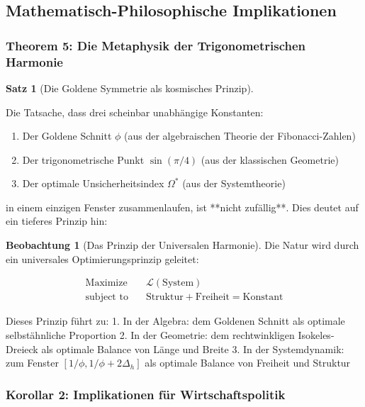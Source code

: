 \documentclass[a4paper,12pt,twoside]{report}
\theoremstyle{definition}
\newtheorem{satz}{Satz}
\newtheorem{beobachtung}{Beobachtung}
\begin{document}
\subsection{Mathematisch-Philosophische Implikationen}

\subsubsection*{Theorem 5: Die Metaphysik der Trigonometrischen Harmonie}

\begin{satz}[Die Goldene Symmetrie als kosmisches Prinzip]
\label{satz:cosmic_harmony}

Die Tatsache, dass drei scheinbar unabhängige Konstanten:

\begin{enumerate}
	\item Der Goldene Schnitt $\phi$ (aus der algebraischen Theorie der Fibonacci-Zahlen)
	\item Der trigonometrische Punkt $\sin(\pi/4)$ (aus der klassischen Geometrie)
	\item Der optimale Unsicherheitsindex $\Omega^*$ (aus der Systemtheorie)
\end{enumerate}

in einem einzigen Fenster zusammenlaufen, ist **nicht zufällig**. Dies deutet auf ein tieferes Prinzip hin:

\begin{beobachtung}[Das Prinzip der Universalen Harmonie]

Die Natur wird durch ein universales Optimierungsprinzip geleitet:

\begin{align}
\text{Maximize} \quad & \mathcal{L}(\text{System}) \\
\text{subject to} \quad & \text{Struktur} + \text{Freiheit} = \text{Konstant}
\end{align}

Dieses Prinzip führt zu:
1. In der Algebra: dem Goldenen Schnitt als optimale selbstähnliche Proportion
2. In der Geometrie: dem rechtwinkligen Isokeles-Dreieck als optimale Balance von Länge und Breite
3. In der Systemdynamik: zum Fenster $[1/\phi, 1/\phi + 2\Delta_h]$ als optimale Balance von Freiheit und Struktur

\end{beobachtung}

\end{satz}

\subsubsection{Korollar 2: Implikationen für Wirtschaftspolitik}
\end{document}
